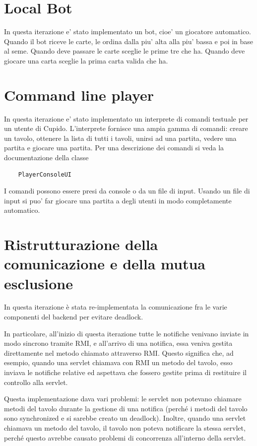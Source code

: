 \section{Local Bot}
  In questa iterazione e' stato implementato un bot, cioe' un giocatore automatico. Quando il bot riceve le carte, le ordina dalla piu' alta alla piu' bassa e poi in base al seme. Quando deve passare le carte sceglie le prime tre che ha. Quando deve giocare una carta sceglie la prima carta valida che ha.

\section{Command line player}
  In questa iterazione e' stato implementato un interprete di comandi testuale per un utente di Cupido. L'interprete fornisce una ampia gamma di comandi: creare un tavolo, ottenere la lista di tutti i tavoli, unirsi ad una partita, vedere una partita e giocare una partita. Per una descrizione dei comandi si veda la documentazione della classe
  \begin{verbatim}
    PlayerConsoleUI
  \end{verbatim}
  I comandi possono essere presi da console o da un file di input. Usando un file di input si puo' far giocare una partita a degli utenti in modo completamente automatico.

\section{Ristrutturazione della comunicazione e della mutua esclusione}
  In questa iterazione \`e stata re-implementata la comunicazione fra le varie
  componenti del backend per evitare deadlock.

  In particolare, all'inizio di questa iterazione tutte le notifiche venivano
  inviate in modo sincrono tramite RMI, e all'arrivo di una notifica, essa
  veniva gestita direttamente nel metodo chiamato attraverso RMI. Questo
  significa che, ad esempio, quando una servlet chiamava con RMI un metodo
  del tavolo, esso inviava le notifiche relative ed aspettava che fossero
  gestite prima di restituire il controllo alla servlet.

  Questa implementazione dava vari problemi: le servlet non potevano chiamare
  metodi del tavolo durante la gestione di una notifica (perch\'e i metodi
  del tavolo sono synchronized e si sarebbe creato un deadlock).
  Inoltre, quando una servlet chiamava un metodo del tavolo, il tavolo non
  poteva notificare la stessa servlet, perch\'e questo avrebbe causato
  problemi di concorrenza all'interno della servlet.

